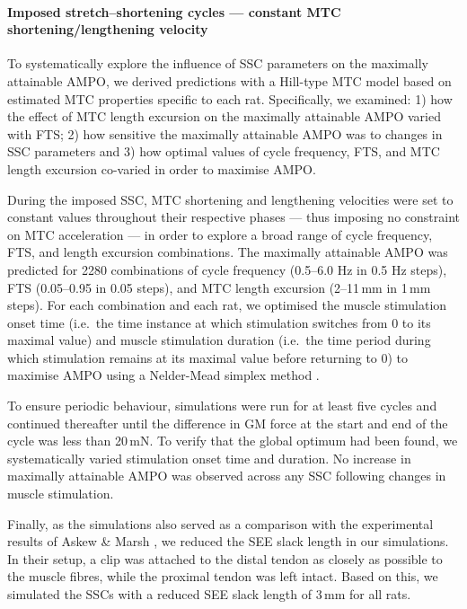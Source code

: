 \documentclass[
  10pt,
  letterpaper,
]{article}
\begin{document}
\paragraph{Imposed stretch--shortening cycles --- constant MTC
shortening/lengthening
velocity}\label{imposed-stretchshortening-cycles-constant-mtc-shorteninglengthening-velocity}

To systematically explore the influence of SSC parameters on the
maximally attainable AMPO, we derived predictions with a Hill-type MTC
model based on estimated MTC properties specific to each rat.
Specifically, we examined: 1) how the effect of MTC length excursion on
the maximally attainable AMPO varied with FTS; 2) how sensitive the
maximally attainable AMPO was to changes in SSC parameters and 3) how
optimal values of cycle frequency, FTS, and MTC length excursion
co-varied in order to maximise AMPO.

During the imposed SSC, MTC shortening and lengthening velocities were
set to constant values throughout their respective phases --- thus
imposing no constraint on MTC acceleration --- in order to explore a
broad range of cycle frequency, FTS, and length excursion combinations.
The maximally attainable AMPO was predicted for 2280 combinations of
cycle frequency (0.5--6.0 Hz in 0.5 Hz steps), FTS (0.05--0.95 in 0.05
steps), and MTC length excursion (2--11\,mm in 1\,mm steps). For each
combination and each rat, we optimised the muscle stimulation onset time
(i.e.~the time instance at which stimulation switches from 0 to its
maximal value) and muscle stimulation duration (i.e.~the time period
during which stimulation remains at its maximal value before returning
to 0) to maximise AMPO using a Nelder-Mead simplex method
\citep{gao_implementing_2012}.

To ensure periodic behaviour, simulations were run for at least five
cycles and continued thereafter until the difference in GM force at the
start and end of the cycle was less than 20\,mN. To verify that the
global optimum had been found, we systematically varied stimulation
onset time and duration. No increase in maximally attainable AMPO was
observed across any SSC following changes in muscle stimulation.

Finally, as the simulations also served as a comparison with the
experimental results of Askew \& Marsh
{\citep{askew_effects_1997, askew_optimal_1998}}, we reduced the SEE
slack length in our simulations. In their setup, a clip was attached to
the distal tendon as closely as possible to the muscle fibres, while the
proximal tendon was left intact. Based on this, we simulated the SSCs
with a reduced SEE slack length of 3\,mm for all rats.
\end{document}
